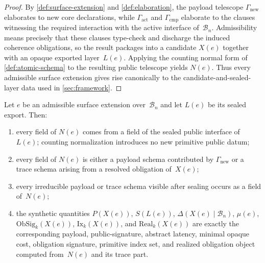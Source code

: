 \documentclass{lmcs}
\newcommand{\B}{\mathcal{B}}
\newcommand{\ObSig}{\mathrm{ObSig}}
\newcommand{\Ix}{\mathrm{Ix}}
\newcommand{\Real}{\mathrm{Real}}
\begin{document}
\begin{proof}
By \autoref{def:surface-extension} and \autoref{def:elaboration}, the payload telescope $\Gamma_{\mathrm{new}}$ elaborates to new core declarations, while $\Gamma_{\mathrm{act}}$ and $\Gamma_{\mathrm{cmp}}$ elaborate to the clauses witnessing the required interaction with the active interface of~$\B_n$. Admissibility means precisely that these clauses type-check and discharge the induced coherence obligations, so the result packages into a candidate $X(e)$ together with an opaque exported layer~$L(e)$. Applying the counting normal form of \autoref{def:atomic-schema} to the resulting public telescope yields $N(e)$. Thus every admissible surface extension gives rise canonically to the candidate-and-sealed-layer data used in \autoref{sec:framework}.
\end{proof}

\begin{thm}
\label{thm:adequacy}
\label{thm:semantic-adequacy}
Let $e$ be an admissible surface extension over~$\B_n$ and let $L(e)$ be its sealed export. Then:
\begin{enumerate}
  \item every field of $N(e)$ comes from a field of the sealed public interface of~$L(e)$; counting normalization introduces no new primitive public datum;
  \item every field of $N(e)$ is either a payload schema contributed by $\Gamma_{\mathrm{new}}$ or a trace schema arising from a resolved obligation of~$X(e)$;
  \item every irreducible payload or trace schema visible after sealing occurs as a field of~$N(e)$;
  \item the synthetic quantities $P(X(e))$, $S(L(e))$, $\Delta(X(e)\mid\B_n)$, $\mu(e)$, $\ObSig_k(X(e))$, $\Ix_k(X(e))$, and $\Real_k(X(e))$ are exactly the corresponding payload, public-signature, abstract latency, minimal opaque cost, obligation signature, primitive index set, and realized obligation object computed from~$N(e)$ and its trace part.
\end{enumerate}
\end{thm}
\end{document}
